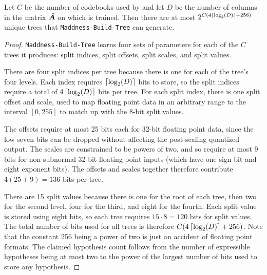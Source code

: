 \begin{lemma} \label{lemma:ntrees}
Let $C$ be the number of codebooks used by \oursp and let $D$ be the number of columns in the matrix $\tilde{\bm{A}}$ on which \oursp is trained. Then there are at most $2^{C (4\left \lceil \log_2(D) \right \rceil + 256)}$ unique trees that \texttt{Maddness-Build-Tree} can generate.
\end{lemma}
\begin{proof}
\texttt{Maddness-Build-Tree} learns four sets of parameters for each of the $C$ trees it produces: split indices, split offsets, split scales, and split values.

There are four split indices per tree because there is one for each of the tree's four levels. Each index requires $\left \lceil \log_2(D) \right \rceil$ bits to store, so the split indices require a total of $4 \left \lceil \log_2(D) \right \rceil$ bits per tree. For each split index, there is one split offset and scale, used to map floating point data in an arbitrary range to the interval $[0, 255]$ to match up with the 8-bit split values.

The offsets require at most 25 bits each for 32-bit floating point data, since the low seven bits can be dropped without affecting the post-scaling quantized output. The scales are constrained to be powers of two, and so require at most 9 bits for non-subnormal 32-bit floating point inputs (which have one sign bit and eight exponent bits). The offsets and scales together therefore contribute $4 (25 + 9) = 136$ bits per tree.

There are 15 split values because there is one for the root of each tree, then two for the second level, four for the third, and eight for the fourth. Each split value is stored using eight bits, so each tree requires $15 \cdot 8 = 120$ bits for split values. The total number of bits used for all trees is therefore $C(4 \left \lceil \log_2(D) \right \rceil + 256)$. Note that the constant 256 being a power of two is just an accident of floating point formats. The claimed hypothesis count follows from the number of expressible hypotheses being at most two to the power of the largest number of bits used to store any hypothesis.
\end{proof}


